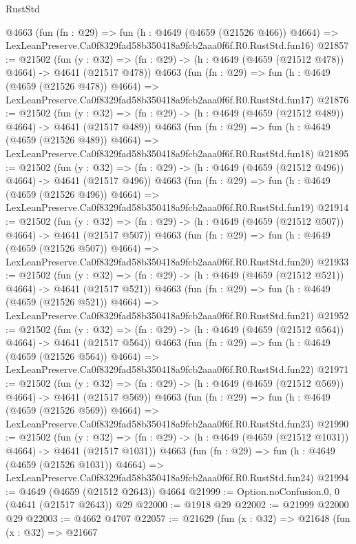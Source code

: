 \begin{lexlean}{RustStd}
\begin{coremodule}
    @4663
    (fun (fn : @29) =>
    fun (h : @4649 (@4659 (@21526 @466)) @4664) =>
    LexLeanPreserve.Ca0f8329fad58b350418a9fcb2aaa0f6f.R0.RustStd.fun16)
@21857 := @21502
    (fun (y : @32) => (fn : @29) -> (h : @4649 (@4659 (@21512 @478)) @4664) -> @4641 (@21517 @478))
    @4663
    (fun (fn : @29) =>
    fun (h : @4649 (@4659 (@21526 @478)) @4664) =>
    LexLeanPreserve.Ca0f8329fad58b350418a9fcb2aaa0f6f.R0.RustStd.fun17)
@21876 := @21502
    (fun (y : @32) => (fn : @29) -> (h : @4649 (@4659 (@21512 @489)) @4664) -> @4641 (@21517 @489))
    @4663
    (fun (fn : @29) =>
    fun (h : @4649 (@4659 (@21526 @489)) @4664) =>
    LexLeanPreserve.Ca0f8329fad58b350418a9fcb2aaa0f6f.R0.RustStd.fun18)
@21895 := @21502
    (fun (y : @32) => (fn : @29) -> (h : @4649 (@4659 (@21512 @496)) @4664) -> @4641 (@21517 @496))
    @4663
    (fun (fn : @29) =>
    fun (h : @4649 (@4659 (@21526 @496)) @4664) =>
    LexLeanPreserve.Ca0f8329fad58b350418a9fcb2aaa0f6f.R0.RustStd.fun19)
@21914 := @21502
    (fun (y : @32) => (fn : @29) -> (h : @4649 (@4659 (@21512 @507)) @4664) -> @4641 (@21517 @507))
    @4663
    (fun (fn : @29) =>
    fun (h : @4649 (@4659 (@21526 @507)) @4664) =>
    LexLeanPreserve.Ca0f8329fad58b350418a9fcb2aaa0f6f.R0.RustStd.fun20)
@21933 := @21502
    (fun (y : @32) => (fn : @29) -> (h : @4649 (@4659 (@21512 @521)) @4664) -> @4641 (@21517 @521))
    @4663
    (fun (fn : @29) =>
    fun (h : @4649 (@4659 (@21526 @521)) @4664) =>
    LexLeanPreserve.Ca0f8329fad58b350418a9fcb2aaa0f6f.R0.RustStd.fun21)
@21952 := @21502
    (fun (y : @32) => (fn : @29) -> (h : @4649 (@4659 (@21512 @564)) @4664) -> @4641 (@21517 @564))
    @4663
    (fun (fn : @29) =>
    fun (h : @4649 (@4659 (@21526 @564)) @4664) =>
    LexLeanPreserve.Ca0f8329fad58b350418a9fcb2aaa0f6f.R0.RustStd.fun22)
@21971 := @21502
    (fun (y : @32) => (fn : @29) -> (h : @4649 (@4659 (@21512 @569)) @4664) -> @4641 (@21517 @569))
    @4663
    (fun (fn : @29) =>
    fun (h : @4649 (@4659 (@21526 @569)) @4664) =>
    LexLeanPreserve.Ca0f8329fad58b350418a9fcb2aaa0f6f.R0.RustStd.fun23)
@21990 := @21502
    (fun (y : @32) =>
    (fn : @29) -> (h : @4649 (@4659 (@21512 @1031)) @4664) -> @4641 (@21517 @1031))
    @4663
    (fun (fn : @29) =>
    fun (h : @4649 (@4659 (@21526 @1031)) @4664) =>
    LexLeanPreserve.Ca0f8329fad58b350418a9fcb2aaa0f6f.R0.RustStd.fun24)
@21994 := @4649 (@4659 (@21512 @2643)) @4664
@21999 := Option.noConfusion.{0, 0} (@4641 (@21517 @2643)) @29
@22000 := @1918 @29
@22002 := @21999 @22000 @29
@22003 := @4662 @4707
@22057 := @21629
    (fun (x : @32) =>
    @21648
      (fun (x : @32) =>
      @21667

\end{coremodule}
\end{lexlean}
